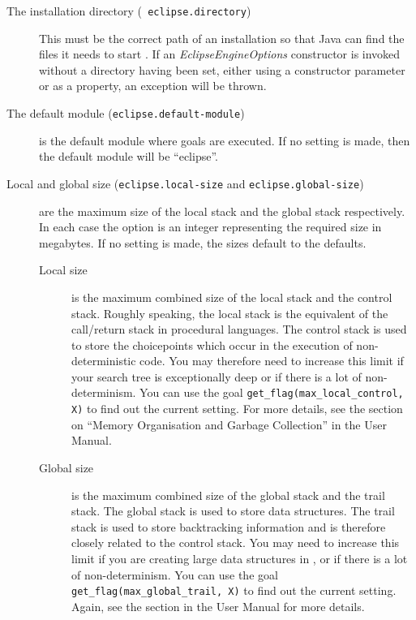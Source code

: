 \begin{description}
\item [The {\eclipse} installation directory ({\tt
eclipse.directory})] This must be the correct path of an {\eclipse}
installation so that Java can find the files it needs to start
{\eclipse}. If an {\it EclipseEngineOptions} constructor is invoked
without a directory having been set, either using a constructor
parameter or as a property, an exception will be thrown.

\item [The default module ({\tt eclipse.default-module})] is the
default {\eclipse} module where goals are executed. If no setting is
made, then the default module will be ``eclipse''.

\item [Local and global size ({\tt eclipse.local-size} and {\tt eclipse.global-size})]
are the maximum size of the local stack and the global stack
respectively. In each case the option is an integer representing the
required size in megabytes. If no setting is made, the sizes default
to the {\eclipse} defaults.

\begin{description} 
\item [Local size] is the maximum combined size of the local 
  stack and the control stack. Roughly speaking, the local stack is
  the {\eclipse} equivalent of the call/return stack in procedural
  languages. The control stack is used to store the choicepoints which
  occur in the execution of non-deterministic code. You may therefore
  need to increase this limit if your search tree is exceptionally
  deep or if there is a lot of non-determinism. You can use the {\eclipse} goal
  {\tt get_flag(max_local_control, X)} to find out the current
  setting. For more details, see the section on ``Memory Organisation
  and Garbage Collection'' in the {\eclipse} User Manual.
\item [Global size] is the maximum combined size of the global 
  stack and the trail stack. The global stack is used to store data
  structures. The trail stack is used to store backtracking
  information and is therefore closely related to the control
  stack. You may need to increase this limit if you are creating large
  data structures in {\eclipse}, or if there is a lot of
  non-determinism. You can use the {\eclipse} goal {\tt
  get_flag(max_global_trail, X)} to find out the current
  setting. Again, see the section in the {\eclipse} User Manual for
  more details.
\end{description}


\end{description}

